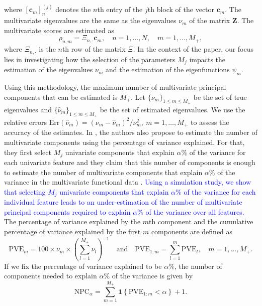 {\begin{equation}
\end{equation}
where $[\mathbf{c}_m]^{(j)}_n$ denotes the $n$th entry of the $j$th block of the vector $\mathbf{c}_m$. The multivariate eigenvalues are the same as the eigenvalues $\nu_m$ of the matrix $\mathbf{Z}$. The multivariate scores are estimated as
\begin{equation}
    \rho_{n,m} = \Xi_{n, \cdot}\mathbf{c}_m, \quad n = 1, \ldots, N, \quad m = 1, \ldots, M_+,
\end{equation}
where $\Xi_{n, \cdot}$ is the $n$th row of the matrix $\Xi$. In the context of the paper, our focus lies in investigating how the selection of the parameters $M_j$ impacts the estimation of the eigenvalues $\nu_m$ and the estimation of the eigenfunctions $\psi_m$.}

Using this methodology, the maximum number of multivariate principal components that can be estimated is $M_+$. Let $\{\nu_m\}_{1 \leq m \leq M_+}$ be the set of true eigenvalues and $\{\widehat{\nu}_m\}_{1 \leq m \leq M_+}$ be the set of estimated eigenvalues. We use the relative errors $\text{Err}(\widehat{\nu}_m)  = (\nu_m - \widehat{\nu}_m)^2 / \nu^2_m,~m = 1, \ldots, M_+$ to assess the accuracy of the estimates. In \cite{happMultivariateFunctionalPrincipal2018}, the authors also propose to estimate the number of multivariate components using the percentage of variance explained. For that, they first select $M_j$ univariate components that explain $\alpha\%$ of the variance for each univariate feature \cite[Chapter 8.2]{ramsayFunctionalDataAnalysis2005} and they claim that this number of components is enough to estimate the number of multivariate components that explain $\alpha\%$ of the variance in the multivariate functional data \cite[Section 3.2]{happMultivariateFunctionalPrincipal2018}. \textcolor{blue}{Using a simulation study, we show that selecting $M_j$ univariate components that explain $\alpha\%$ of the variance for each individual feature leads to an under-estimation of the number of multivariate principal components required to explain $\alpha\%$ of the variance over all features.} The percentage of variance explained by the $m$th component and the cumulative percentage of variance explained by the first $m$ components are defined as
\begin{equation}\label{eq:pve}
     \text{PVE}_m = 100 \times \nu_m \times \left(\sum_{l = 1}^{M_+} \nu_l\right)^{-1} \quad\text{and}\quad \text{PVE}_{1:m} = \sum_{l = 1}^m \text{PVE}_l, \quad m = 1, \dots, M_+.
\end{equation}
If we fix the percentage of variance explained to be $\alpha\%$, the number of components needed to explain $\alpha\%$ of the variance is given by
\begin{equation}\label{eq:npc}
     \text{NPC}_{\alpha} = \sum_{m = 1}^{M_{+}} \mathbf{1}\left\{\text{PVE}_{1:m} < \alpha\right\} + 1.
\end{equation}


